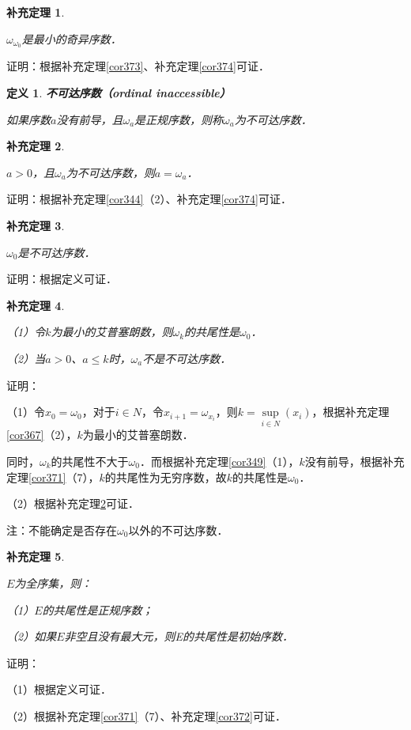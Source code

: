 \documentclass[12pt, a4paper, oneside]{book}
\newtheorem{cor}{补充定理}
\newtheorem{de}{定义}
\begin{document}
			\begin{cor}\label{cor375}
				\hfill\par
				$\omega_{\omega_0}$是最小的奇异序数．
			\end{cor}
			证明：根据补充定理\ref{cor373}、补充定理\ref{cor374}可证．
			
			\begin{de}
				\textbf{不可达序数（ordinal inaccessible）}
				\par
				如果序数$a$没有前导，且$\omega_a$是正规序数，则称$\omega_a$为不可达序数．
			\end{de}
			
			\begin{cor}\label{cor376}
				\hfill\par
				$a>0$，且$\omega_a$为不可达序数，则$a=\omega_a$．
			\end{cor}
			证明：根据补充定理\ref{cor344}（2）、补充定理\ref{cor374}可证．
			
			\begin{cor}\label{cor377}
				\hfill\par
				$\omega_0$是不可达序数．
			\end{cor}
			证明：根据定义可证．
			
			\begin{cor}\label{cor378}
				\hfill\par
				（1）令$k$为最小的艾普塞朗数，则$\omega_k$的共尾性是$\omega_0$．
				\par
				（2）当$a>0$、$a\leq k$时，$\omega_a$不是不可达序数．
			\end{cor}
			证明：
			\par
			（1）令$x_0=\omega_0$，对于$i\in N$，令$x_{i+1}=\omega_{x_i}$，则$k=\mathop{sup}\limits_{i\in N}(x_i)$，根据补充定理\ref{cor367}（2），$k$为最小的艾普塞朗数．
			\par
			同时，$\omega_k$的共尾性不大于$\omega_0$．而根据补充定理\ref{cor349}（1），$k$没有前导，根据补充定理\ref{cor371}（7），$k$的共尾性为无穷序数，故$k$的共尾性是$\omega_0$．
			\par
			（2）根据补充定理\ref{cor376}可证．
			\par
			注：不能确定是否存在$\omega_0$以外的不可达序数．
			
			\begin{cor}\label{cor379}
				\hfill\par
				$E$为全序集，则：
				\par
				（1）$E$的共尾性是正规序数；
				\par
				（2）如果$E$非空且没有最大元，则E的共尾性是初始序数．
			\end{cor}
			证明：
			\par
			（1）根据定义可证．
			\par
			（2）根据补充定理\ref{cor371}（7）、补充定理\ref{cor372}可证．
			
\end{document}
